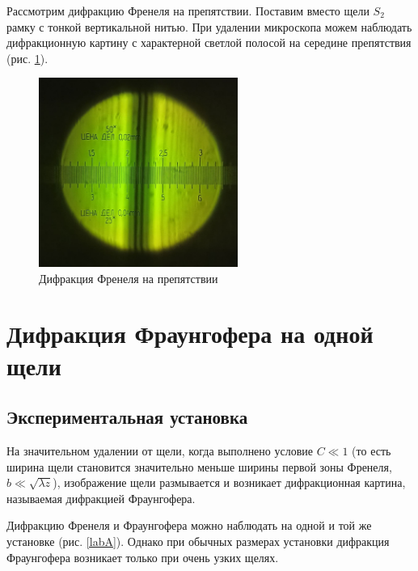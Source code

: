 \documentclass[a4paper,12pt]{article} %
\begin{document}
Рассмотрим дифракцию Френеля на препятствии. Поставим вместо щели $ S_2 $ рамку с тонкой вертикальной нитью. При удалении микроскопа можем наблюдать дифракционную картину с характерной светлой полосой на середине препятствия (рис. \ref{dif_nit}).

\begin{figure}[h!]
	\begin{center}
		\includegraphics[width=6.5cm]{dif_nit.jpg}
	\end{center}
\caption{Дифракция Френеля на препятствии}
\label{dif_nit}
\end{figure}

\section{Дифракция Фраунгофера на одной щели}

\subsection{Экспериментальная установка}

На значительном удалении от щели, когда выполнено условие $ C \ll 1 $
(то есть ширина щели становится значительно меньше ширины первой
зоны Френеля, $ b \ll \sqrt{\lambda z} $), изображение щели размывается и возникает
дифракционная картина, называемая дифракцией Фраунгофера.

Дифракцию Френеля и Фраунгофера можно наблюдать на одной
и той же установке (рис. \ref{labA}). Однако при обычных размерах установки дифракция Фраунгофера возникает только при очень узких щелях.
\end{document}
